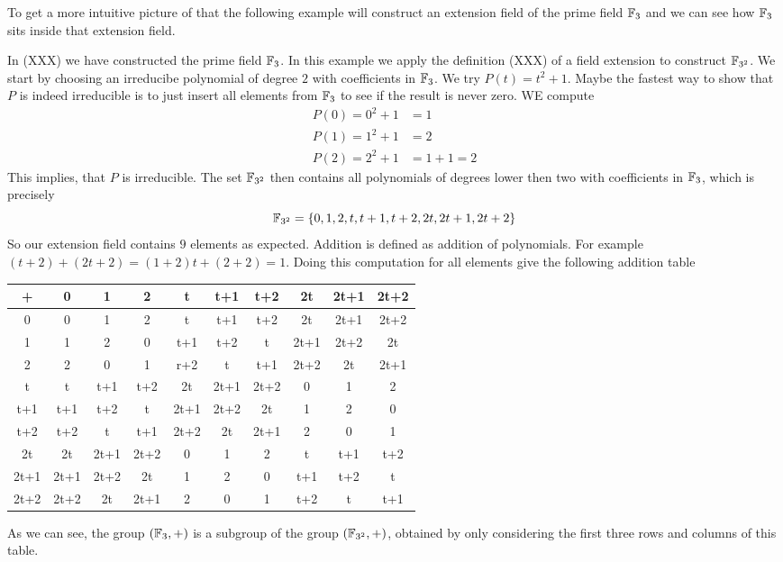 To get a more intuitive picture of that the following example will construct an extension field of the prime field $\mathbb{F}_3$ and we can see how $\mathbb{F}_3$ sits inside that extension field. 
\begin{example}In (XXX) we have constructed the prime field $\mathbb{F}_3$. In this example we apply the definition (XXX) of a field extension to construct $\mathbb{F}_{3^2}$. We start by choosing an irreducibe polynomial of degree $2$ with coefficients in $\mathbb{F}_3$. We try
$P(t)=t^2+1$. Maybe the fastest way to show that $P$ is indeed irreducible is to just insert all elements from $\mathbb{F}_3$ to see if the result is never zero. WE compute
\begin{align*}
P(0) = 0^2+1 &= 1\\
P(1) = 1^2+1 &= 2\\
P(2) = 2^2+1 &=  1+1  = 2
\end{align*}
This implies, that $P$ is irreducible. The set $\mathbb{F}_{3^2}$ then contains all polynomials of degrees lower then two with coefficients in $\mathbb{F}_3$, which is precisely
$$
\mathbb{F}_{3^2}=\{0,1,2,t,t+1,t+2,2t,2t+1,2t+2\}
$$
So our extension field contains $9$ elements as expected. Addition is  defined as addition of polynomials. For example $(t+2) + (2t+2)= (1+2)t +(2+2)= 1$. Doing this computation for all elements give the following addition table
\begin{center}
  \begin{tabular}{c | c c c c c c c c c}
    + & 0    & 1    & 2    & t    & t+1  & t+2  & 2t   & 2t+1 & 2t+2 \\\hline
    0 & 0    & 1    & 2    & t    & t+1  & t+2  & 2t   & 2t+1 & 2t+2 \\
    1 & 1    & 2    & 0    & t+1  & t+2  & t    & 2t+1 & 2t+2 & 2t   \\
    2 & 2    & 0    & 1    & r+2  & t    & t+1  & 2t+2 & 2t   & 2t+1 \\
    t & t    & t+1  & t+2  & 2t   & 2t+1 & 2t+2 & 0    & 1    & 2    \\
  t+1 & t+1  & t+2  & t    & 2t+1 & 2t+2 & 2t   & 1    & 2    & 0    \\
  t+2 & t+2  & t    & t+1  & 2t+2 & 2t   & 2t+1 & 2    & 0    & 1    \\
   2t & 2t   & 2t+1 & 2t+2 & 0    & 1    & 2    & t    & t+1  & t+2  \\
 2t+1 & 2t+1 & 2t+2 & 2t   & 1    & 2    & 0    & t+1  & t+2  & t    \\
 2t+2 & 2t+2 & 2t   & 2t+1 & 2    & 0    & 1    & t+2  & t    & t+1
  \end{tabular}
\end{center}
As we can see, the group $(\mathbb{F}_3,+)$ is a subgroup of the group $(\mathbb{F}_{3^2},+)$, obtained by only considering the first three rows and columns of this table.


\end{example}
